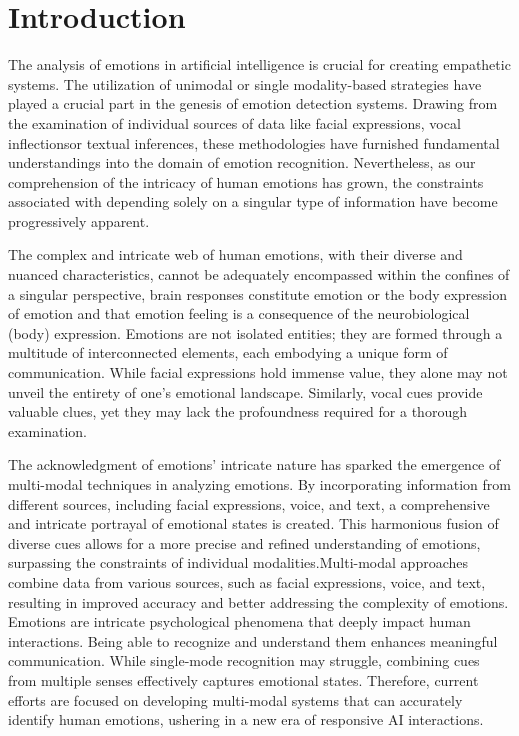 \documentclass[conference]{IEEEtran}
\begin{document}
\section{Introduction}
The analysis of emotions in artificial intelligence is crucial for creating empathetic systems. The utilization of unimodal or single modality-based strategies have played a crucial part in the genesis of emotion detection systems. Drawing from the examination of individual sources of data like facial expressions\cite{r1}\cite{r2}, vocal inflections\cite{r4}\cite{r5}or textual inferences\cite{r3}, these methodologies have furnished fundamental understandings into the domain of emotion recognition. Nevertheless, as our comprehension of the intricacy of human emotions has grown, the constraints associated with depending solely on a singular type of information have become progressively apparent.

The complex and intricate web of human emotions, with their diverse and nuanced characteristics, cannot be adequately encompassed within the confines of a singular perspective, brain responses constitute emotion or the body expression of emotion and that emotion feeling is a consequence of the neurobiological (body) expression\cite{r6}. Emotions are not isolated entities; they are formed through a multitude of interconnected elements, each embodying a unique form of communication. While facial expressions hold immense value, they alone may not unveil the entirety of one's emotional landscape. Similarly, vocal cues provide valuable clues, yet they may lack the profoundness required for a thorough examination\cite{r7}. 

The acknowledgment of emotions' intricate nature has sparked the emergence of multi-modal techniques in analyzing emotions. By incorporating information from different sources, including facial expressions, voice, and text, a comprehensive and intricate portrayal of emotional states is created. This harmonious fusion of diverse cues allows for a more precise and refined understanding of emotions, surpassing the constraints of individual modalities.Multi-modal approaches combine data from various sources, such as facial expressions, voice, and text, resulting in improved accuracy and better addressing the complexity of emotions. Emotions are intricate psychological phenomena that deeply impact human interactions. Being able to recognize and understand them enhances meaningful communication. While single-mode recognition may struggle, combining cues from multiple senses effectively captures emotional states. Therefore, current efforts are focused on developing multi-modal systems that can accurately identify human emotions, ushering in a new era of responsive AI interactions.
\end{document}
